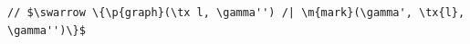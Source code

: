 \documentclass[acmsmall,screen]{acmart}  %
\newcommand{\li}[1]{{\texttt{\small #1}}} %
\newcommand{\MV}{\ensuremath{\mathsf{ModVar}}}
\newcommand{\pguards}[1]{\llbracket #1 \rrbracket}
\newcommand{\tx}[1]{\text{#1}}
\newcommand{\p}[1]{\ensuremath{\mathsf{#1}}} \newcommand{\m}[1]{\ensuremath{\mathit{#1}}} \newcommand{\ma}[1]{\ensuremath{\mathcal{#1}}} \let\ramify\lightning
\newcommand{\infrulestyle}[1]{\textsc{#1}}
\begin{document}

\begin{lstlisting}[firstnumber=25]
// $\swarrow \{\p{graph}(\tx l, \gamma'') /| \m{mark}(\gamma', \tx{l}, \gamma'')\}$
\end{lstlisting}
\end{document}
